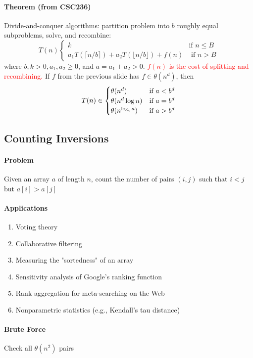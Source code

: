 \documentclass[11pt]{article}
\begin{document}
\paragraph{Theorem (from CSC236)}
Divide-and-conquer algorithms: partition problem into $b$ roughly equal subproblems, solve, and recombine:
$$T(n) \begin{cases}
	k & \text{if $n \leq B$} \\
a_1T(\lceil n / b \rceil) + a_2T(\lfloor n/b \rfloor) + f(n) & \text{ if $n > B$}
\end{cases}$$
where $b, k >0, a_1, a_2 \geq 0$, and $a = a_1 + a_2 > 0$. \textcolor{red}{$f(n)$ is the cost of splitting and recombining.} If $f$ from the previous slide has $f \in \theta(n^d)$, then
$$T(n) \in \begin{cases}
	\theta(n^d) & \text{if $ a < b^d$} \\
	\theta(n^d\log n) & \text{if $a = b^d$} \\
	\theta(n^{\log_b a}) & \text{if $a > b^d$}
\end{cases}
$$
\subsection{Counting Inversions}
\paragraph{Problem}
Given an array $a$ of length $n$, count the number of pairs $(i,j)$ such that $i < j$ but $a[i] > a[j]$
\paragraph{Applications}
\begin{enumerate}
	\item Voting theory
	\item Collaborative filtering
	\item Measuring the "sortedness" of an array
	\item Sensitivity analysis of Google's ranking function
	\item Rank aggregation for meta-searching on the Web
	\item Nonparametric statistics (e.g., Kendall's tau distance)
\end{enumerate}

\paragraph{Brute Force}
Check all $\theta(n^2)$ pairs
\end{document}
